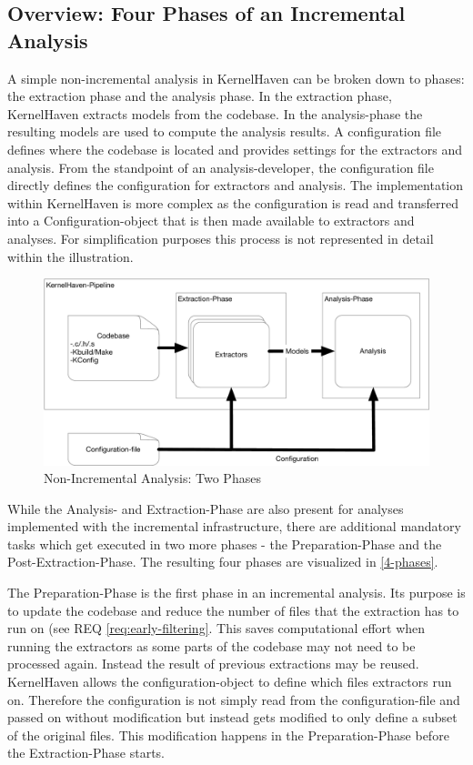 \documentclass[a4paper]{article}
\begin{document}
\subsection{Overview: Four Phases of an Incremental Analysis}


A simple non-incremental analysis in KernelHaven can be broken down to phases: the extraction phase and the analysis phase. In the extraction phase, KernelHaven extracts models from the codebase. In the analysis-phase the resulting models are used to compute the analysis results. A configuration file defines where the codebase is located and provides settings for the extractors and analysis. From the standpoint of an analysis-developer, the configuration file directly defines the configuration for extractors and analysis. The implementation within KernelHaven is more complex as the configuration is read and transferred into a Configuration-object that is then made available to extractors and analyses. For simplification purposes this process is not represented in detail within the illustration. 

\begin{figure}[h] 
  \centering
  \begin{minipage}[b]{0.7\textwidth} 
    \caption[Non-Incremental Analysis: Two Phases]{Non-Incremental Analysis: Two Phases}\label{2-phases}
    \includegraphics[width=1\textwidth]{img/KernelHaven.pdf}
  \end{minipage}
\end{figure}

While the Analysis- and Extraction-Phase are also present for analyses implemented with the incremental infrastructure, there are additional mandatory tasks which get executed in two more phases - the Preparation-Phase and the Post-Extraction-Phase. The resulting four phases are visualized in \autoref{4-phases}.

The Preparation-Phase is the first phase in an incremental analysis. Its purpose is to update the codebase and reduce the number of files that the extraction has to run on (see REQ \ref{req:early-filtering}. This saves computational effort when running the extractors as some parts of the codebase  may not need to be processed again. Instead the result of previous extractions may be reused. KernelHaven allows the configuration-object to define which files extractors run on. Therefore the configuration is not simply read from the configuration-file and passed on without modification but instead gets modified to only define a subset of the original files. This modification happens in the Preparation-Phase before the Extraction-Phase starts.
\end{document}
